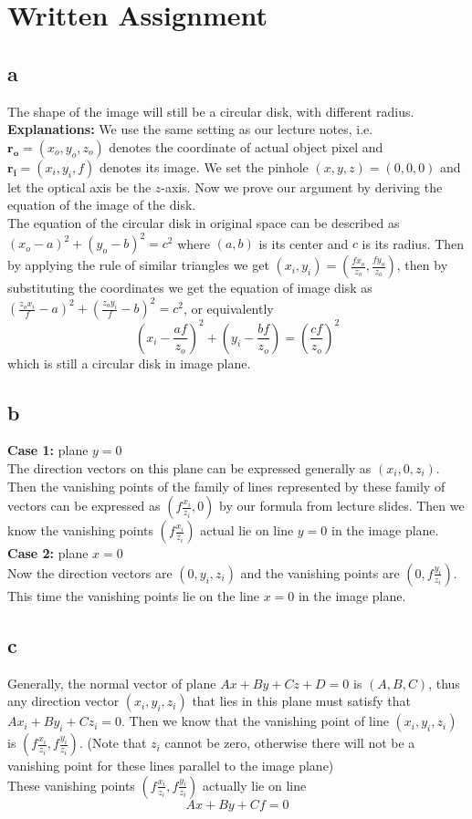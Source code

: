 \documentclass[12pt,letterpaper]{article}
\begin{document}
\section{Written Assignment}
\subsection*{a}
The shape of the image will still be a circular disk, with different radius.\\
\textbf{Explanations:}
We use the same setting as our lecture notes, i.e. $\boldsymbol{r_o}=(x_o,y_o,z_o)$ denotes
the coordinate of actual object pixel and $\boldsymbol{r_i}=(x_i,y_i,f)$ denotes its image.
We set the pinhole $(x,y,z)=(0,0,0)$ and let the optical axis be the $z$-axis.
Now we prove our argument by deriving the equation of the image of the disk.\\
The equation of the circular disk in original space can be described as $(x_o-a)^2+(y_o-b)^2=c^2$
where $(a,b)$ is its center and $c$ is its radius. Then by applying the rule of similar triangles 
we get $(x_i,y_i)=(\frac{fx_o}{z_o},\frac{fy_o}{z_o})$, then by substituting the coordinates
we get the equation of image disk as $(\frac{z_ox_i}{f}-a)^2+(\frac{z_oy_i}{f}-b)^2=c^2$,
or equivalently $$(x_i-\frac{af}{z_o})^2+(y_i-\frac{bf}{z_o})=(\frac{cf}{z_o})^2$$
which is still a circular disk in image plane.
\subsection*{b}
\textbf{Case 1:} plane $y=0$\\
The direction vectors on this plane can be expressed generally as $(x_i,0,z_i)$.
Then the vanishing points of the family of lines represented by these family of vectors
can be expressed as $(f\frac{x_i}{z_i},0)$ by our formula from lecture slides.
Then we know the vanishing points $(f\frac{x_i}{z_i})$ actual lie on line $y=0$ in the image plane.\\
\textbf{Case 2:} plane $x=0$\\
Now the direction vectors are $(0,y_i,z_i)$ and the vanishing points are $(0,f\frac{y_i}{z_i})$.
This time the vanishing points lie on the line $x=0$ in the image plane.
\subsection*{c}
Generally, the normal vector of plane $Ax+By+Cz+D=0$ is $(A,B,C)$, thus any direction vector $(x_i,y_i,z_i)$
that lies in this plane must satisfy that $Ax_i+By_i+Cz_i=0$. 
Then we know that the vanishing point of line $(x_i,y_i,z_i)$ is $(f\frac{x_i}{z_i},f\frac{y_i}{z_i})$.
(Note that $z_i$ cannot be zero, otherwise there will not be a vanishing point for these lines parallel to the image plane)\\
These vanishing points $(f\frac{x_i}{z_i},f\frac{y_i}{z_i})$ actually lie on line
$$Ax+By+Cf=0$$
\end{document}
